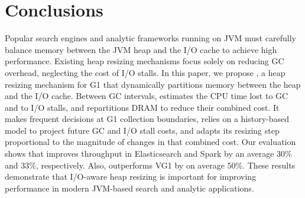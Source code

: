 \section{Conclusions}

Popular search engines and analytic frameworks running on JVM must carefully balance memory between the JVM heap and the I/O cache to achieve high performance.
Existing heap resizing mechanisms focus solely on reducing GC overhead, neglecting the cost of I/O stalls.
%
In this paper, we propose \flexheapName{}, a heap resizing mechanism for G1 that dynamically partitions memory between the heap and the I/O cache.
Between GC intervals, \flexheapName{} estimates the CPU time lost to GC and to I/O stalls, and repartitions DRAM to reduce their combined cost.
It makes frequent decisions at G1 collection boundaries, relies on a history-based model to project future GC and I/O stall costs, and adapts its resizing step proportional to the magnitude of changes in that combined cost.
%
Our evaluation shows that \flexheapName{} improves throughput in Elasticsearch and Spark by an average 30\% and 33\%, respectively.
Also, \flexheapName{} outperforms VG1 by on average 50\%.
These results demonstrate that I/O-aware heap resizing is important for improving performance in modern JVM-based search and analytic applications.
